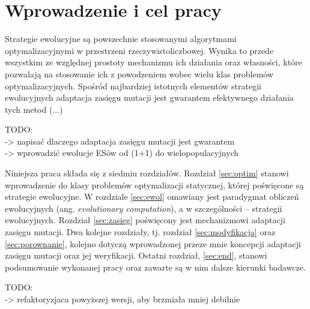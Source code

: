 \newpage
\section{Wprowadzenie i cel pracy}
\label{sec:intro}

Strategie ewolucyjne są powszechnie stosowanymi algorytmami optymalizacyjnymi w przestrzeni rzeczywistoliczbowej. Wynika to przede wszystkim ze względnej prostoty mechanizmu ich działania oraz własności, które pozwalają na stosowanie ich z powodzeniem wobec wielu klas problemów optymalizacyjnych. Spośród najbardziej istotnych elementów strategii ewolucyjnych adaptacja zasięgu mutacji jest gwarantem efektywnego działania tych metod (...)


{\color{red}
    TODO: \\
    -> napisać dlaczego adaptacja zasięgu mutacji jest gwarantem \\
    -> wprowadzić ewolucje ESów od (1+1) do wielopopulacyjnych \\
}

Niniejsza praca składa się z siedmiu rozdziałów. Rozdział \ref{sec:optim} stanowi wprowadzenie do klasy problemów optymalizacji statycznej, której poświęcone są strategie ewolucyjne. W rozdziale \ref{sec:ewol} omawiany jest paradygmat obliczeń ewolucyjnych (ang. \textit{evolutionary computation}), a w szczególności -- strategii ewolucyjnych. Rozdział \ref{sec:zasieg} poświęcony jest mechanizmowi adaptacji zasięgu mutacji. Dwa kolejne rozdziały, tj. rozdział \ref{sec:modyfikacja} oraz \ref{sec:porownanie}, kolejno dotyczą wprowadzonej przeze mnie koncepcji adaptacji zasięgu mutacji oraz jej weryfikacji. Ostatni rozdział, \ref{sec:end}, stanowi podsumowanie wykonanej pracy oraz zawarte są w nim dalsze kierunki badawcze.

{\color{red}
    TODO: \\
    -> refaktoryzjaca powyższej wersji, aby brzmiała mniej debilnie \\
    
}
